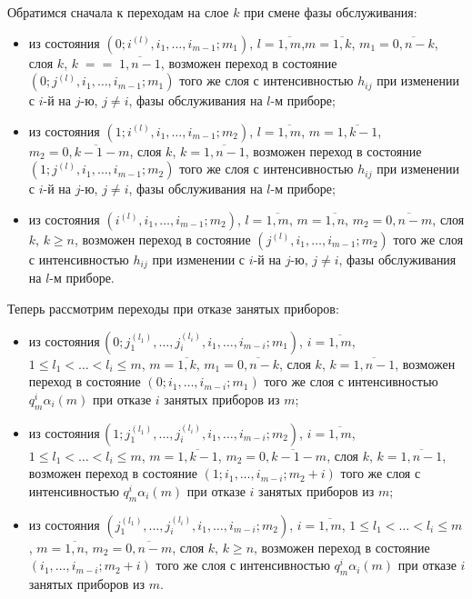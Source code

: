 \begin{multicols}{2}
Обратимся сначала к переходам на слое $k$ при смене фазы обслуживания:
\begin{itemize}
\item из состояния $\left (0;i^{(l)},i_1,\ldots,i_{m-1};m_1\right )$,
$l=\overline{1,m}$,\linebreak $m=\overline{1,k}$, $m_1=\overline{0,n-k}$,
слоя $k$, $k\;=$\linebreak $=\;\overline{1,n-1}$, возможен переход в состояние
$\left (0;j^{(l)},i_1,\ldots,i_{m-1};m_1\right )$ того же слоя с интенсивностью
$h_{ij}$ при изменении с $i$-й на $j$-ю, $j\ne i$, фазы обслуживания
на $l$-м приборе;
\item
 из состояния $\left(1;i^{(l)},i_1,\ldots,i_{m-1};m_2\right)$,
$l=\overline{1,m}$, $m=\overline{1,k-1}$, $m_2=\overline{0,k-1-m}$,
слоя $k$, $k=\overline{1,n-1}$, возможен переход в состояние
$\left (1;j^{(l)},i_1,\ldots,i_{m-1};m_2\right )$ того же слоя с интенсивностью
$h_{ij}$ при изменении с $i$-й на $j$-ю, $j\ne i$, фазы обслуживания
на $l$-м приборе;
\item
 из состояния $\left (i^{(l)},i_1,\ldots,i_{m-1};m_2\right )$,
$l=\overline{1,m}$, $m=\overline{1,n}$, $m_2=\overline{0,n-m}$,
слоя $k$, $k\ge n$, возможен переход в состояние
$\left (j^{(l)},i_1,\ldots,i_{m-1};m_2\right )$ того же слоя с интенсивностью
$h_{ij}$ при изменении с $i$-й на $j$-ю, $j\ne i$, фазы обслуживания
на $l$-м приборе.
\end{itemize}

Теперь рассмотрим переходы при отказе занятых приборов:
\begin{itemize}
\item из состояния\,$\left (0;j_1^{(l_1)}\!,\ldots,j_i^{(l_i)},i_1,\ldots,i_{m-i};m_1\right )$,
$i=\overline{1,m}$, $1\le l_1<\ldots<l_i\le m$,
$m=\overline{1,k}$, $m_1=\overline{0,n-k}$,
слоя $k$, $k=\overline{1,n-1}$, возможен переход в состояние
$(0;i_1,\ldots,i_{m-i};m_1)$ того же слоя с интенсивностью
$q^i_m\alpha_i(m)$ при отказе $i$ занятых приборов из $m$;
\item
 из состояния\,$\left (1;j_1^{(l_1)}\!,\ldots,j_i^{(l_i)},i_1,\ldots,i_{m-i};m_2\right )$,
$i=\overline{1,m}$, $1\le l_1<\ldots<l_i\le m$, 
$m=\overline{1,k-1}$, $m_2=\overline{0,k-1-m}$,
слоя $k$, $k=\overline{1,n-1}$, возможен переход в состояние
$(1;i_1,\ldots,i_{m-i};m_2+i)$ того же слоя с интенсивностью
$q^i_m\alpha_i(m)$ при отказе $i$ занятых приборов из $m$;
\item
из состояния $\left (j_1^{(l_1)},\ldots,j_i^{(l_i)},i_1,\ldots,i_{m-i};m_2\right )$,
$i=\overline{1,m}$, $1\le l_1<\ldots<l_i\le m$,
$m=\overline{1,n}$, $m_2=\overline{0,n-m}$,
слоя $k$, $k\ge n$, возможен переход в состояние
$(i_1,\ldots,i_{m-i};m_2+i)$ того же слоя с интенсивностью
$q^i_m\alpha_i(m)$ при отказе $i$ занятых приборов из $m$.
\end{itemize}


\end{multicols}
